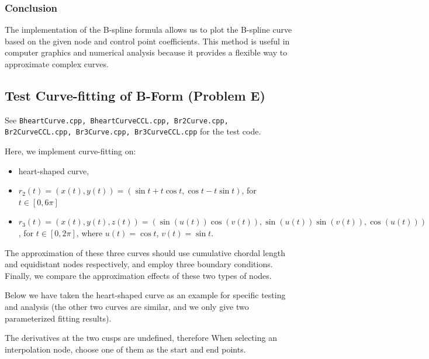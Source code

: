 \documentclass{article}
\begin{document}
\subsubsection{Conclusion}
The implementation of the B-spline formula allows us to plot the B-spline curve based on the given node and control point coefficients. This method is useful in computer graphics and numerical analysis because it provides a flexible way to approximate complex curves.


\subsection{Test Curve-fitting of B-Form (Problem E)}
See \texttt{BheartCurve.cpp, BheartCurveCCL.cpp, Br2Curve.cpp, Br2CurveCCL.cpp, Br3Curve.cpp, Br3CurveCCL.cpp} for the test code.\par
Here, we implement curve-fitting on:
\begin{itemize}
    \item heart-shaped curve,
    \item \( r_2(t) = (x(t), y(t)) = (\sin t + t \cos t, \cos t - t \sin t) \), for \( t \in [0, 6\pi] \)
    \item \( r_3(t) = (x(t), y(t), z(t)) = (\sin(u(t)) \cos(v(t)), \sin(u(t)) \sin(v(t)), \cos(u(t))) \), for \( t \in [0, 2\pi] \), where \( u(t) = \cos t \), \( v(t) = \sin t \).
\end{itemize}
The approximation of these three curves should use cumulative chordal length and equidistant nodes respectively, and employ three boundary conditions. Finally, we compare the approximation effects of these two types of nodes.\par
Below we have taken the heart-shaped curve as an example for specific testing and analysis (the other two curves are similar, and we only give two parameterized fitting results).\par
The derivatives at the two cusps are undefined, therefore When selecting an interpolation node, choose one of them as the start and end points.
\end{document}
